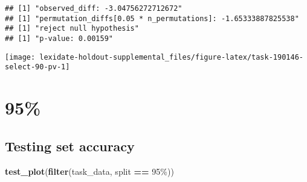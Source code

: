 \documentclass[
]{book}
\newenvironment{Shaded}{\begin{snugshade}}{\end{snugshade}}
\newcommand{\AttributeTok}[1]{\textcolor[rgb]{0.13,0.29,0.53}{#1}}
\newcommand{\DecValTok}[1]{\textcolor[rgb]{0.00,0.00,0.81}{#1}}
\newcommand{\FunctionTok}[1]{\textcolor[rgb]{0.13,0.29,0.53}{\textbf{#1}}}
\newcommand{\NormalTok}[1]{#1}
\newcommand{\OtherTok}[1]{\textcolor[rgb]{0.56,0.35,0.01}{#1}}
\newcommand{\SpecialCharTok}[1]{\textcolor[rgb]{0.81,0.36,0.00}{\textbf{#1}}}
\newcommand{\StringTok}[1]{\textcolor[rgb]{0.31,0.60,0.02}{#1}}
\begin{document}
\begin{Shaded}
\end{Shaded}

\begin{verbatim}
## [1] "observed_diff: -3.04756272712672"
## [1] "permutation_diffs[0.05 * n_permutations]: -1.65333887825538"
## [1] "reject null hypothesis"
## [1] "p-value: 0.00159"
\end{verbatim}

\texttt{[image: lexidate-holdout-supplemental\_files/figure-latex/task-190146-select-90-pv-1]}

\hypertarget{section-19}{%
\section{95\%}\label{section-19}}

\hypertarget{testing-set-accuracy-19}{%
\subsection{Testing set accuracy}\label{testing-set-accuracy-19}}

\begin{Shaded}
\begin{Highlighting}[]
\FunctionTok{test\_plot}\NormalTok{(}\FunctionTok{filter}\NormalTok{(task\_data, split }\SpecialCharTok{==} \StringTok{\textquotesingle{}95\%\textquotesingle{}}\NormalTok{))}
\end{Highlighting}
\end{Shaded}
\end{document}
